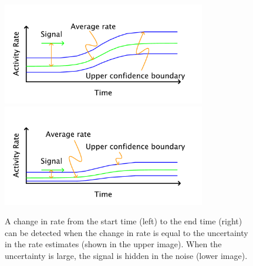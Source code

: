 \documentclass{article}
\begin{document}
%
\begin{figure}[h]
    \centering
    \includegraphics[width=3.5in]{./imgs/fig3a.pdf}
    \includegraphics[width=3.5in]{./imgs/fig3b.pdf}
        \caption{A change in rate from the start time (left) to the end time (right) can be detected when the change in rate is equal to the uncertainty in the rate estimates (shown in the upper image). When the uncertainty is large, the signal is hidden in the noise (lower image).}
    \label{fig:signal}
\end{figure}
%
%
\end{document}
